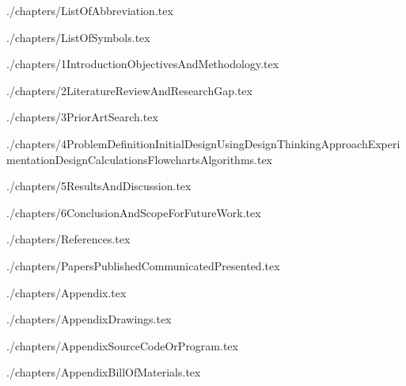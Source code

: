 \documentclass[a4paper,12pt]{report} %
\date{}                        %
\begin{document}
 \setcounter{page}{1}           %
\newpage \tableofcontents                            %

\newpage \listoftables                               %

\newpage 
{%
\let\oldnumberline\numberline%
\renewcommand{\numberline}{\figurename~\oldnumberline}%
\listoffigures                                       %
}

\newpage
\thispagestyle{plain}

{./chapters/ListOfAbbreviation.tex}

{./chapters/ListOfSymbols.tex}      

{./chapters/1IntroductionObjectivesAndMethodology.tex}

{./chapters/2LiteratureReviewAndResearchGap.tex}

{./chapters/3PriorArtSearch.tex}

{./chapters/4ProblemDefinitionInitialDesignUsingDesignThinkingApproachExperimentationDesignCalculationsFlowchartsAlgorithms.tex}

{./chapters/5ResultsAndDiscussion.tex}

{./chapters/6ConclusionAndScopeForFutureWork.tex}

\setcounter{secnumdepth}{0} %

{./chapters/References.tex}  

{./chapters/PapersPublishedCommunicatedPresented.tex}

{./chapters/Appendix.tex}

{./chapters/AppendixDrawings.tex}

{./chapters/AppendixSourceCodeOrProgram.tex}  

{./chapters/AppendixBillOfMaterials.tex}  
\end{document}
